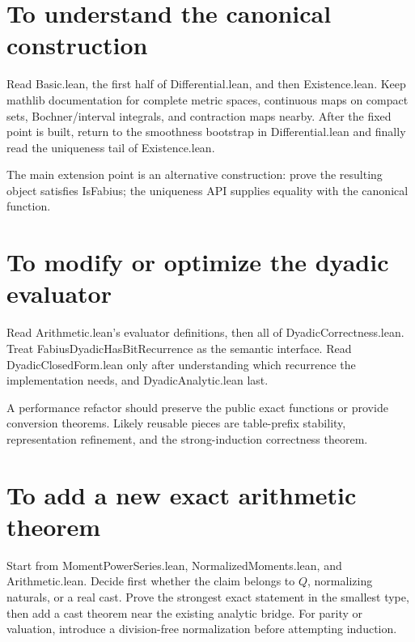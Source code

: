 \documentclass[11pt,a4paper,openany]{book}
\def\module#1{#1.lean}
\def\decl#1{#1}
\def\Q{Q}
\newcommand{\Q}{\ensuremath{\mathbb{Q}}}
\newcommand{\module}[1]{\nolinkurl{#1.lean}}
\newcommand{\decl}[1]{\texttt{\detokenize{#1}}}
\begin{document}
\section{To understand the canonical construction}
\begin{readingpath}
Read \module{Basic}, the first half of \module{Differential}, and then
\module{Existence}.  Keep mathlib documentation for complete metric spaces,
continuous maps on compact sets, Bochner/interval integrals, and contraction
maps nearby.  After the fixed point is built, return to the smoothness
bootstrap in \module{Differential} and finally read the uniqueness tail of
\module{Existence}.
\end{readingpath}
The main extension point is an alternative construction: prove the resulting
object satisfies \decl{IsFabius}; the uniqueness API supplies equality with the
canonical function.

\section{To modify or optimize the dyadic evaluator}
\begin{readingpath}
Read \module{Arithmetic}'s evaluator definitions, then all of
\module{DyadicCorrectness}.  Treat \decl{FabiusDyadicHasBitRecurrence} as the
semantic interface.  Read \module{DyadicClosedForm} only after understanding
which recurrence the implementation needs, and \module{DyadicAnalytic} last.
\end{readingpath}
A performance refactor should preserve the public exact functions or provide
conversion theorems.  Likely reusable pieces are table-prefix stability,
representation refinement, and the strong-induction correctness theorem.

\section{To add a new exact arithmetic theorem}
Start from \module{MomentPowerSeries}, \module{NormalizedMoments}, and
\module{Arithmetic}.  Decide first whether the claim belongs to $\Q$,
normalizing naturals, or a real cast.  Prove the strongest exact statement in
the smallest type, then add a cast theorem near the existing analytic bridge.
For parity or valuation, introduce a division-free normalization before
attempting induction.
\end{document}
